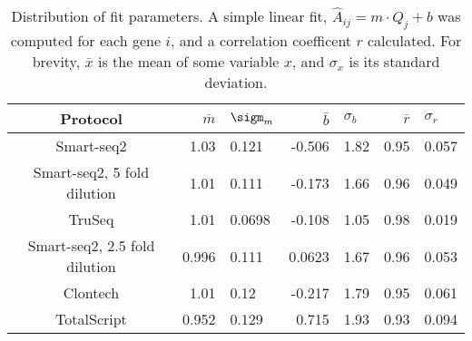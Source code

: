 
\begin{table}[htdp]

\caption{Distribution of fit parameters. A simple linear fit,
             $\hat{A}_{ij} = m \cdot Q_{j} + b$
             was computed for each gene $i$, and a correlation coefficent $r$
             calculated.  For brevity,
             $\bar{x}$ is the mean of some variable $x$, and $\sigma_x$ is its
             standard deviation.  }
             \begin{center}
             \begin{tabular}{|c|r@{$\pm$}l|r@{$\pm$}l|r@{$\pm$}l|}
             \hline Protocol & $\bar{m}$ & $\sigm_m$ & $\bar{b}$ & $\sigma_b$
                    & $\bar{r}$ & $\sigma_r$ \\\hline
             Smart-seq2 & 1.03 & 0.121 & -0.506 & 1.82 & 0.95 & 0.057 \\
Smart-seq2, 5 fold dilution & 1.01 & 0.111 & -0.173 & 1.66 & 0.96 & 0.049 \\
TruSeq & 1.01 & 0.0698 & -0.108 & 1.05 & 0.98 & 0.019 \\
Smart-seq2, 2.5 fold dilution & 0.996 & 0.111 & 0.0623 & 1.67 & 0.96 & 0.053 \\
Clontech & 1.01 & 0.12 & -0.217 & 1.79 & 0.95 & 0.061 \\
TotalScript & 0.952 & 0.129 & 0.715 & 1.93 & 0.93 & 0.094 \\

\hline

\end{tabular}
\label{tab:fits}
\end{center}
\end{table}



              